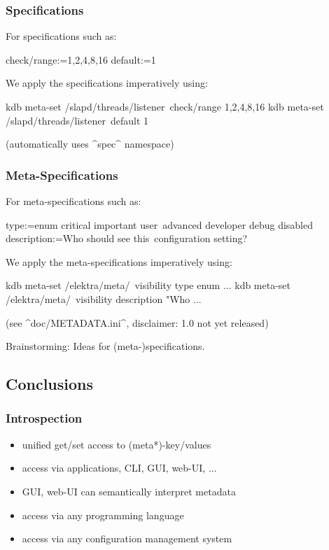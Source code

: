 \begin{frame}[fragile]
	\frametitle{Specifications}
	For specifications such as:

	\begin{code}
	  check/range:=1,2,4,8,16
	  default:=1
	\end{code}

	We apply the specifications imperatively using:

	\begin{code}[language=bash,morekeywords={meta-set}]
	kdb meta-set /slapd/threads/listener\
		check/range 1,2,4,8,16
	kdb meta-set /slapd/threads/listener\
	       	default 1
	\end{code}

	(automatically uses ^spec^ namespace)
\end{frame}

\begin{frame}[fragile]
	\frametitle{Meta-Specifications}
	For meta-specifications such as:

	\small
	\begin{code}
	[visibility]
	type:=enum critical important user\
	      advanced developer debug disabled
	description:=Who should see this\
	     configuration setting?
	\end{code}

	We apply the meta-specifications imperatively using:

	\begin{code}[language=bash,morekeywords={meta-set}]
	kdb meta-set /elektra/meta/\
		visibility type enum ...
	kdb meta-set /elektra/meta/\
		visibility description "Who ...
	\end{code}

	(see ^doc/METADATA.ini^, disclaimer: 1.0 not yet released)
\end{frame}

\begin{assignment}
	\begin{task}
	Brainstorming: Ideas for (meta-)specifications.
	\end{task}
\end{assignment}

\subsection{Conclusions}

\begin{frame}
	\frametitle{Introspection}
	\begin{itemize}[<+->]
	\item unified get/set access to (meta*)-key/values
	\item access via applications, CLI, GUI, web-UI, ...
	\item GUI, web-UI can semantically interpret metadata
	\item access via any programming language
	\item access via any configuration management system
	\end{itemize}
\end{frame}

